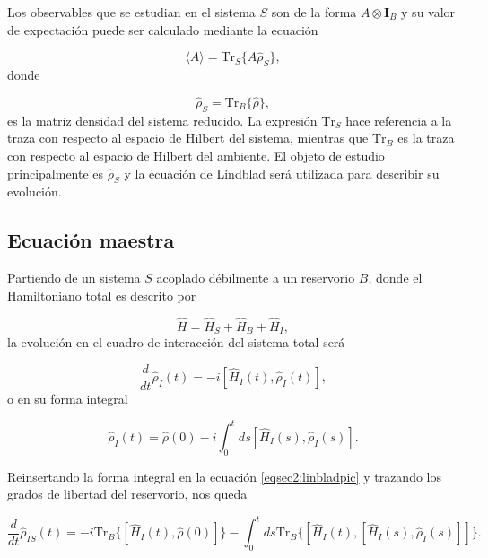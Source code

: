 Los observables que se estudian en el sistema $S$ son de la forma $A\otimes \mathbf{I}_{B}$ y su valor de expectación puede ser calculado mediante la ecuación

\begin{equation*}
    \langle A \rangle = \text{Tr}_{S}\{A \hat{\rho}_{S} \},
\end{equation*}
donde 

\begin{equation*}
    \hat{\rho}_{S} = \text{Tr}_{B}\{ \hat{\rho} \},
\end{equation*}
es la matriz densidad del sistema reducido. La expresión $\text{Tr}_{S}$ hace referencia a la traza con respecto al espacio de Hilbert del sistema, mientras que $\text{Tr}_{B}$  
es la traza con respecto al espacio de Hilbert del ambiente. El objeto de estudio principalmente es $\hat{\rho}_{S}$ y la ecuación de Lindblad será utilizada para describir su evolución.

\subsection{Ecuación maestra}
Partiendo de un sistema $S$ acoplado débilmente a un reservorio $B$, donde el Hamiltoniano total es descrito por 

\begin{equation*}
    \hat{H} = \hat{H}_{S} + \hat{H}_{B} + \hat{H}_{I},
\end{equation*}
la evolución en el cuadro de interacción del sistema total será

\begin{equation}
    \frac{d}{dt}\hat{\rho}_{I}(t) = -i[\hat{H}_{I}(t), \hat{\rho}_{I}(t)],
    \label{eqsec2:linbladpic}
\end{equation}
o en su forma integral

\begin{equation*}
    \hat{\rho}_{I}(t) = \hat{\rho}(0) - i  \int_{0}^{t} ds[\hat{H}_{I}(s), \hat{\rho}_{I}(s)].
\end{equation*}

Reinsertando la forma integral en la ecuación \ref{eqsec2:linbladpic} y trazando los grados de libertad del reservorio, nos queda

\begin{equation}
    \frac{d}{dt}\hat{\rho}_{IS}(t) = -i  \text{Tr}_{B}\{[\hat{H}_{I}(t),\hat{\rho}(0)] \}  -  \int_{0}^{t}ds \text{Tr}_{B}\{[\hat{H}_{I}(t), [\hat{H}_{I}(s),\hat{\rho}_{I}(s)]]\}.
\end{equation}

